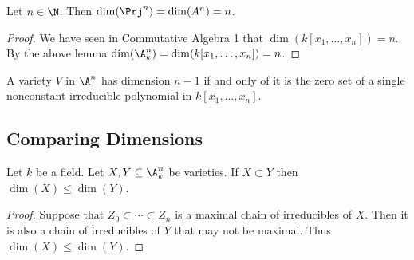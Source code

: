 \documentclass[a4paper]{article}
\begin{document}
\begin{lmm}{}{} Let $n\in\N$. Then $\dim(\Prj^n)=\dim(A^n)=n$. \tcbline
\begin{proof}
We have seen in Commutative Algebra 1 that $\dim(k[x_1,\dots,x_n])=n$. By the above lemma $\dim(\A_k^n)=\dim(k[x_1,\dots,x_n])=n$. 
\end{proof}
\end{lmm}

\begin{prp}{}{} A variety $V$ in $\A^n$ has dimension $n-1$ if and only of it is the zero set of a single nonconstant irreducible polynomial in $k[x_1,\dots,x_n]$. 
\end{prp}

\subsection{Comparing Dimensions}
\begin{lmm}{}{} Let $k$ be a field. Let $X,Y\subseteq\A_k^n$ be varieties. If $X\subset Y$ then $\dim(X)\leq\dim(Y)$. \tcbline
\begin{proof}
Suppose that $Z_0\subset\cdots\subset Z_n$ is a maximal chain of irreducibles of $X$. Then it is also a chain of irreducibles of $Y$ that may not be maximal. Thus $\dim(X)\leq\dim(Y)$. 
\end{proof}
\end{lmm}
\end{document}
